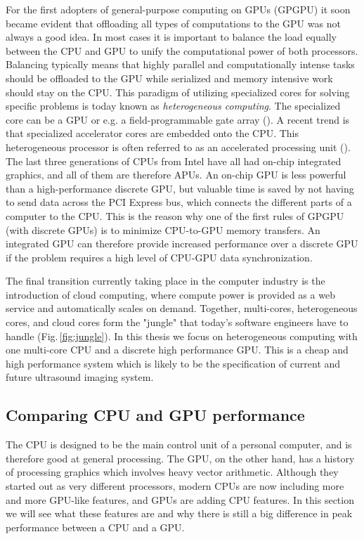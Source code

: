 For the first adopters of general-purpose computing on GPUs (GPGPU) it soon became evident that offloading all types of computations to the GPU was not always a good idea. In most cases it is important to balance the load equally between the CPU and GPU to unify the computational power of both processors. Balancing typically means that highly parallel and computationally intense tasks should be offloaded to the GPU while serialized and memory intensive work should stay on the CPU. This paradigm of utilizing specialized cores for solving specific problems is today known as \textit{heterogeneous computing}. The specialized core can be a GPU or e.g. a field-programmable gate array (). A recent trend is that specialized accelerator cores are embedded onto the CPU. This heterogeneous processor is often referred to as an accelerated processing unit (). The last three generations of CPUs from Intel have all had on-chip integrated graphics, and all of them are therefore APUs. An on-chip GPU is less powerful than a high-performance discrete GPU, but valuable time is saved by not having to send data across the PCI Express bus, which connects the different parts of a computer to the CPU. This is the reason why one of the first rules of GPGPU (with discrete GPUs) is to minimize CPU-to-GPU memory transfers. An integrated GPU can therefore provide increased performance over a discrete GPU if the problem requires a high level of CPU-GPU data synchronization.

The final transition currently taking place in the computer industry is the introduction of cloud computing, where compute power is provided as a web service and automatically scales on demand. Together, multi-cores, heterogeneous cores, and cloud cores form the "jungle" that today's software engineers have to handle (Fig.\,\ref{fig:jungle}). In this thesis we focus on heterogeneous computing with one multi-core CPU and a discrete high performance GPU. This is a cheap and high performance system which is likely to be the specification of current and future ultrasound imaging system.

\subsection{Comparing CPU and GPU performance}\label{sec:cpu_vs_gpu}
The CPU is designed to be the main control unit of a personal computer, and is therefore good at general processing. The GPU, on the other hand, has a history of processing graphics which involves heavy vector arithmetic. Although they started out as very different processors, modern CPUs are now including more and more GPU-like features, and GPUs are adding CPU features. In this section we will see what these features are and why there is still a big difference in peak performance between a CPU and a GPU.

